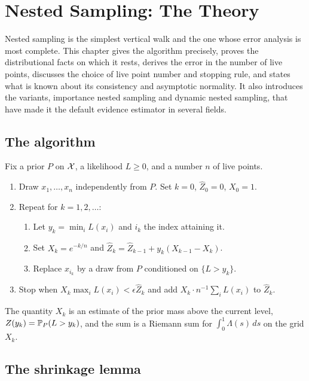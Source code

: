 \chapter{Nested Sampling: The Theory}
\label{ch:nested}

Nested sampling is the simplest vertical walk and the one whose error analysis is most complete. This chapter gives the algorithm precisely, proves the distributional facts on which it rests, derives the error in the number of live points, discusses the choice of live point number and stopping rule, and states what is known about its consistency and asymptotic normality. It also introduces the variants, importance nested sampling and dynamic nested sampling, that have made it the default evidence estimator in several fields.

\section{The algorithm}

Fix a prior $P$ on $\mathcal{X}$, a likelihood $L \ge 0$, and a number $n$ of live points.

\begin{enumerate}
\item Draw $x_1, \dots, x_n$ independently from $P$. Set $k = 0$, $\hat Z_0 = 0$, $X_0 = 1$.
\item Repeat for $k = 1, 2, \dots$:
\begin{enumerate}
\item Let $y_k = \min_i L(x_i)$ and $i_k$ the index attaining it.
\item Set $X_k = e^{-k/n}$ and $\hat Z_k = \hat Z_{k-1} + y_k (X_{k-1} - X_k)$.
\item Replace $x_{i_k}$ by a draw from $P$ conditioned on $\{ L > y_k \}$.
\end{enumerate}
\item Stop when $X_k \max_i L(x_i) < \epsilon \hat Z_k$ and add $X_k \cdot n^{-1} \sum_i L(x_i)$ to $\hat Z_k$.
\end{enumerate}

The quantity $X_k$ is an estimate of the prior mass above the current level, $Z(y_k) = \mathbb{P}_P(L > y_k)$, and the sum is a Riemann sum for $\int_0^1 \Lambda(s) \, ds$ on the grid $X_k$.

\section{The shrinkage lemma}

